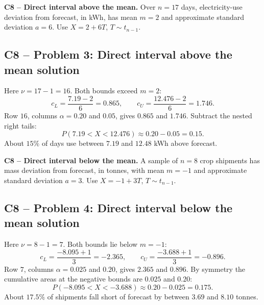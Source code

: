 {
\textbf{C8 -- Direct interval above the mean.} Over $n=17$ days, electricity-use deviation from forecast, in kWh, has mean $m=2$ and approximate standard deviation $a=6$. Use $X=2+6T$, $T\sim t_{n-1}$.
\label{sol:q3}
\subsection*{C8 -- Problem 3: Direct interval above the mean solution }
Here $\nu=17-1=16$. Both bounds exceed $m=2$:
\[
 c_L=\frac{7.19-2}{6}=0.865,\qquad c_U=\frac{12.476-2}{6}=1.746.
\]
Row $16$, columns $\alpha=0.20$ and $0.05$, gives $0.865$ and $1.746$.
Subtract the nested right tails:
\[
 P(7.19<X<12.476)\approx0.20-0.05=\boxed{0.15}.
\]
About $15\%$ of days use between $7.19$ and $12.48$ kWh above forecast.
\secInicio[sec:q3]
}

{
\textbf{C8 -- Direct interval below the mean.} A sample of $n=8$ crop shipments has mass deviation from forecast, in tonnes, with mean $m=-1$ and approximate standard deviation $a=3$. Use $X=-1+3T$, $T\sim t_{n-1}$.
\label{sol:q4}
\subsection*{C8 -- Problem 4: Direct interval below the mean solution }
Here $\nu=8-1=7$. Both bounds lie below $m=-1$:
\[
 c_L=\frac{-8.095+1}{3}=-2.365,\qquad c_U=\frac{-3.688+1}{3}=-0.896.
\]
Row $7$, columns $\alpha=0.025$ and $0.20$, gives $2.365$ and $0.896$.
By symmetry the cumulative areas at the negative bounds are $0.025$ and $0.20$:
\[
 P(-8.095<X<-3.688)\approx0.20-0.025=\boxed{0.175}.
\]
About $17.5\%$ of shipments fall short of forecast by between $3.69$ and $8.10$ tonnes.
\secInicio[sec:q4]
}

